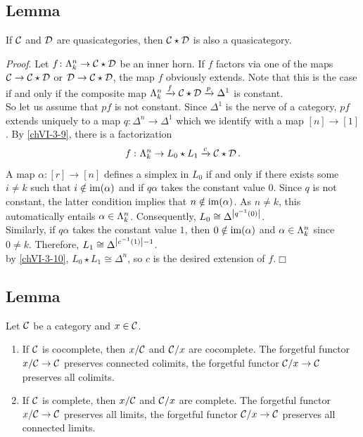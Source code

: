     \subsection{Lemma}\label{chVI-3-11}
        If $\mathcal{C}$ and $\mathcal{D}$ are quasicategories, then $\mathcal{C} \star \mathcal{D}$ is also a quasicategory.
        \smallskip

        \emph{Proof}. Let $f \colon \Lambda^{n}_{k} \to \mathcal{C} \star \mathcal{D}$ be an inner horn. If $f$ factors via one of the maps $\mathcal{C} \to \mathcal{C} \star \mathcal{D}$ or $\mathcal{D} \to \mathcal{C} \star \mathcal{D}$, the map $f$ obviously extends. Note that this is the case if and only if the composite map $\Lambda^{n}_{k} \xrightarrow{f} \mathcal{C} \star \mathcal{D} \xrightarrow{p} \Delta^1$ is constant.\\
        So let us assume that $p f$ is not constant. Since $\Delta^1$ is the nerve of a category, $p f$ extends uniquely to a map $q \colon \Delta^n \to \Delta^1$ which we identify with a map $[n] \to [1]$. By \ref{chVI-3-9}, there is a factorization
        \begin{equation*}
            f \,\colon \Lambda^{n}_{k} \to L_0 \star L_1 \xrightarrow{c} \mathcal{C} \star \mathcal{D} \,.
        \end{equation*}
        A map $\alpha \colon [r] \to [n]$ defines a simplex in $L_0$ if and only if there exists some $i \ne k$ such that $i \notin \operatorname{im}(\alpha)$ and if $q \alpha$ takes the constant value $0$. Since $q$ is not constant, the latter condition implies that $n \notin \operatorname{im}(\alpha)$. As $n \ne k$, this automatically entails $\alpha \in \Lambda^{n}_{k}$. Consequently, $L_0 \cong \Delta^{\left| q^{-1}(0) \right|}$.\\
        Similarly, if $q \alpha$ takes the constant value $1$, then $0 \notin \operatorname{im}(\alpha)$ and $\alpha \in \Lambda^{n}_{k}$ since $0 \ne k$. Therefore, $L_1 \cong \Delta^{\left| c^{-1}(1) \right|-1}$.\\
        by \ref{chVI-3-10}, $L_0 \star L_1 \cong \Delta^n$, so $c$ is the desired extension of $f$.\hfill$\Box$

    \subsection{Lemma}\label{chVI-3-12}
        Let $\mathcal{C}$ be a category and $x \in \mathcal{C}$.
        \begin{enumerate}[label=\roman*)]
            \item 
                If $\mathcal{C}$ is cocomplete, then $x/\mathcal{C}$ and $\mathcal{C}/x$ are cocomplete. The forgetful functor $x/\mathcal{C} \to \mathcal{C}$ preserves connected colimits, the forgetful functor $\mathcal{C}/x \to \mathcal{C}$ preserves all colimits.
            \item 
                If $\mathcal{C}$ is complete, then $x/\mathcal{C}$ and $\mathcal{C}/x$ are complete. The forgetful functor $x/\mathcal{C} \to \mathcal{C}$ preserves all limits, the forgetful functor $\mathcal{C}/x \to \mathcal{C}$ preserves all connected limits.
        \end{enumerate}

